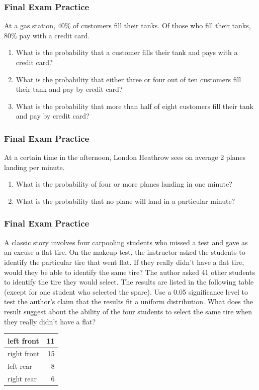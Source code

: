 \documentclass[xcolor=dvipsnames]{beamer} \usepackage{teachbeamer}
\begin{document}
\begin{frame}
  \frametitle{Final Exam Practice} {\ubung} At a gas station, 40\% of customers fill their tanks. Of those who fill their tanks, 80\% pay with a credit card.
  \begin{enumerate}
  \item What is the probability that a customer fills their tank and pays with a credit card?
  \item What is the probability that either three or four out of ten customers fill their tank and pay by credit card?
  \item What is the probability that more than half of eight customers fill their tank and pay by credit card?
  \end{enumerate}
\end{frame}

\begin{frame}
  \frametitle{Final Exam Practice} {\ubung} At a certain time in the afternoon, London Heathrow sees on average 2 planes landing per minute.
  \begin{enumerate}
  \item What is the probability of four or more planes landing in one minute?
  \item What is the probability that no plane will land in a particular minute?
  \end{enumerate}
\end{frame}

\begin{frame}
  \frametitle{Final Exam Practice} {\ubung} A classic story involves four carpooling students who missed a test and gave as an excuse a flat tire. On the makeup test, the instructor asked the students to identify the particular tire that went flat. If they really didn't have a flat tire, would they be able to identify the same tire? The author asked 41 other students to identify the tire they would select. The results are listed in the following table (except for one student who selected the spare). Use a 0.05 significance level to test the author's claim that the results fit a uniform distribution. What does the result suggest about the ability of the four students to select the same tire when they really didn't have a flat?

  \begin{tabular}{|l|r|}\hline left front & 11 \\ \hline right front & 15 \\ \hline left rear & 8 \\ \hline right rear & 6 \\ \hline
  \end{tabular} %
\end{frame}
\end{document}
